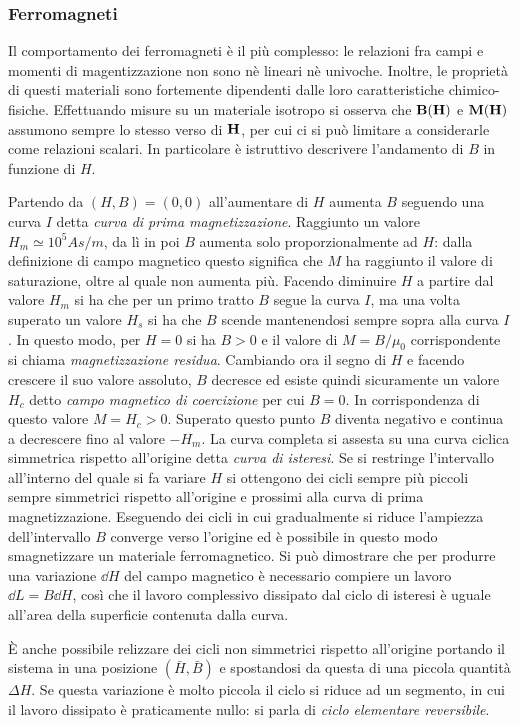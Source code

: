 \subsubsection{Ferromagneti}
Il comportamento dei ferromagneti è il più complesso: le relazioni fra campi e momenti di magentizzazione
non sono nè lineari nè univoche. Inoltre, le proprietà di questi materiali sono fortemente dipendenti dalle
loro caratteristiche chimico-fisiche.
Effettuando misure su un materiale isotropo si osserva che $\vb{B}(\vb{H})$ e $\vb{M}(\vb{H})$ assumono
sempre lo stesso verso di $\vb{H}$, per cui ci si può limitare a considerarle come relazioni scalari.
In particolare è istruttivo descrivere l'andamento di $B$ in funzione di $H$.

Partendo da $(H,B)=(0,0)$ all'aumentare di $H$ aumenta $B$ seguendo una curva $I$ detta
\textit{curva di prima magnetizzazione}. Raggiunto un valore $H_m\simeq 10^5 As/m$, da lì in poi $B$ aumenta
solo proporzionalmente ad $H$: dalla definizione di campo magnetico questo significa che $M$
ha raggiunto il valore di saturazione, oltre al quale non aumenta più.
Facendo diminuire $H$ a partire dal valore $H_m$ si ha che per un primo tratto $B$ segue la curva $I$, ma una
volta superato un valore $H_s$ si ha che $B$ scende mantenendosi sempre sopra alla curva $I$. In questo modo,
per $H=0$ si ha $B>0$ e il valore di $M=B/\mu_0$ corrispondente si chiama \textit{magnetizzazione residua}.
Cambiando ora il segno di $H$ e facendo crescere il suo valore assoluto, $B$ decresce ed esiste quindi sicuramente
un valore $H_c$ detto \textit{campo magnetico di coercizione} per cui $B=0$. In corrispondenza di questo valore
$M=H_c>0$. Superato questo punto $B$ diventa negativo e continua a decrescere fino al valore $-H_m$.
La curva completa si assesta su una curva ciclica simmetrica rispetto all'origine
detta \textit{curva di isteresi}. Se si restringe l'intervallo
all'interno del quale si fa variare $H$ si ottengono dei cicli sempre più piccoli sempre simmetrici rispetto all'origine
e prossimi alla curva di prima magnetizzazione. Eseguendo dei cicli in cui gradualmente si riduce l'ampiezza
dell'intervallo $B$ converge verso l'origine ed è possibile in questo modo smagnetizzare un materiale ferromagnetico.
Si può dimostrare che per produrre una variazione $\dd{H}$ del campo magnetico è necessario compiere
un lavoro $\dd{L}=B\dd{H}$, così che il lavoro complessivo dissipato dal ciclo di isteresi è
uguale all'area della superficie contenuta dalla curva.

È anche possibile relizzare dei cicli non simmetrici rispetto all'origine portando il sistema in una
posizione $(\bar{H},\bar{B})$ e spostandosi da questa di una piccola quantità $\Delta H$. Se questa variazione
è molto piccola il ciclo si riduce ad un segmento, in cui il lavoro dissipato è praticamente nullo: si parla di
\textit{ciclo elementare reversibile}.

